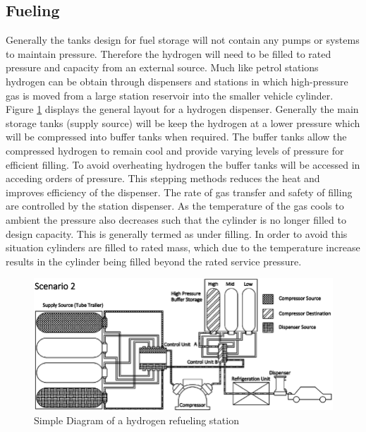 \documentclass[paper=a4, fontsize=11pt, abstract=on]{scrartcl}
\numberwithin{equation}{section}		%
\numberwithin{figure}{section}			%
\numberwithin{table}{section}				%
\begin{document}
\subsection{Fueling}
Generally the tanks design for fuel storage will not contain any pumps or systems to maintain pressure. Therefore the hydrogen will need to be filled to rated pressure and capacity from an external source. Much like petrol stations hydrogen can be obtain through dispensers and stations in which high-pressure gas is moved from a large station reservoir into the smaller vehicle cylinder. Figure \ref{station} displays the general layout for a hydrogen dispenser. Generally the main storage tanks (supply source) will be keep the hydrogen at a lower pressure which will be compressed into buffer tanks when required. The buffer tanks allow the compressed hydrogen to remain cool and provide varying levels of pressure for efficient filling. To avoid overheating hydrogen the buffer tanks will be accessed in acceding orders of pressure. This stepping methods reduces the heat and improves efficiency of the dispenser. The rate of gas transfer and safety of filling are controlled by the station dispenser. As the temperature of the gas cools to ambient the pressure also decreases such that the cylinder is no longer filled to design capacity. This is generally termed as under filling. In order to avoid this situation cylinders are filled to rated mass, which due to the temperature increase results in the cylinder being filled beyond the rated service pressure. 

\begin{figure}[H]
\centering
\includegraphics[width=0.8\linewidth]{station}
\caption{Simple Diagram of a hydrogen refueling station}
\label{station}
\end{figure}
\end{document}
